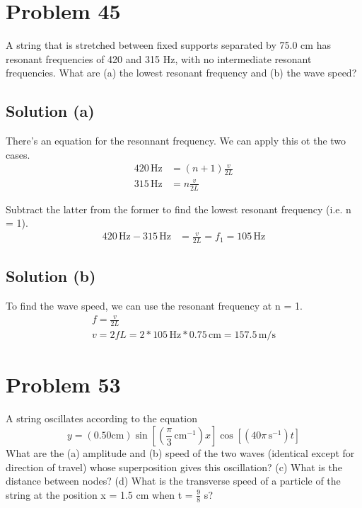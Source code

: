 \documentclass[12pt]{article}
\begin{document}
    \pagebreak
    \section{Problem 45}
        A string that is stretched between fixed supports separated by 75.0 cm has resonant frequencies of 420 and 315 Hz, with no intermediate resonant frequencies. 
        What are (a) the lowest resonant frequency and (b) the wave speed?

        \subsection{Solution (a)}
            There's an equation for the resonnant frequency.
            We can apply this ot the two cases.
            \begin{align}
                420\,\unit{\hertz}  &=  (n + 1)\frac{v}{2L}\\
                315\,\unit{\hertz}  &=  n\frac{v}{2L}
            \end{align}

            Subtract the latter from the former to find the lowest resonant frequency (i.e. n = 1).
            \begin{align}
                420\,\unit{\hertz} - 315\,\unit{\hertz} &=  \frac{v}{2L}
                    =   f_1
                    =   \boxed{105\,\unit{\hertz}}
            \end{align}

        \subsection{Solution (b)}
            To find the wave speed, we can use the resonant frequency at n = 1.
            \begin{gather}
                f   =   \frac{v}{2L}\\
                v   =   2fL
                    =   2 * 105\,\unit{\hertz} * 0.75\,\unit{\centi\meter}
                    =   \boxed{157.5\,\unit{\meter/\second}}
            \end{gather}

    \pagebreak
    \section{Problem 53}
        A string oscillates according to the equation
        \begin{equation}
            y = (0.50 \unit{\centi\meter}) \sin \left[  \left( \frac{\pi}{3}\,\unit{\centi\meter^{-1}} \right)x \right] \cos\left[ (40\pi\,\unit{\second^{-1}} )t \right]
        \end{equation}
        What are the (a) amplitude and (b) speed of the two waves (identical except for direction of travel) whose superposition gives this oscillation? 
        (c) What is the distance between nodes? 
        (d) What is the transverse speed of a particle of the string at the position x = 1.5 cm when t = $\frac{9}{8}$ s?
\end{document}
